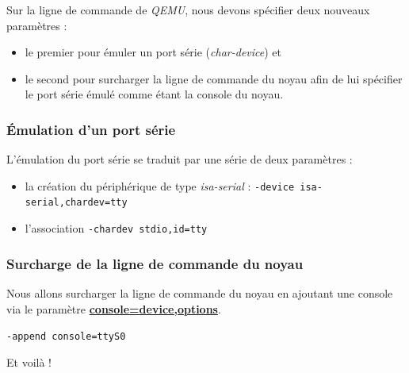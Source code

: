 \documentclass[a4paper]{article}
\begin{document}
Sur la ligne de commande de \textit{QEMU}, nous devons spécifier deux nouveaux paramètres :
\begin{itemize}
\item le premier pour émuler un port série (\textit{char-device}) et
\item le second pour surcharger la ligne de commande du noyau afin de lui spécifier le port série émulé comme étant la console du noyau.
\end{itemize}

\subsubsection{Émulation d'un port série}

L'émulation du port série se traduit par une série de deux paramètres :
\begin{itemize}
\item la création du périphérique de type \textit{isa-serial} : \lstset{language=sh}\lstinline{-device isa-serial,chardev=tty}
\item l'association \lstset{language=sh}\lstinline{-chardev stdio,id=tty}
\end{itemize}

\subsubsection{Surcharge de la ligne de commande du noyau}

Nous allons surcharger la ligne de commande du noyau en ajoutant une console via le paramètre \href{https://www.kernel.org/doc/Documentation/serial-console.txt}{\textbf{console=device,options}}.

\lstset{language=sh}\lstinline{-append console=ttyS0}

Et voilà !
\end{document}
